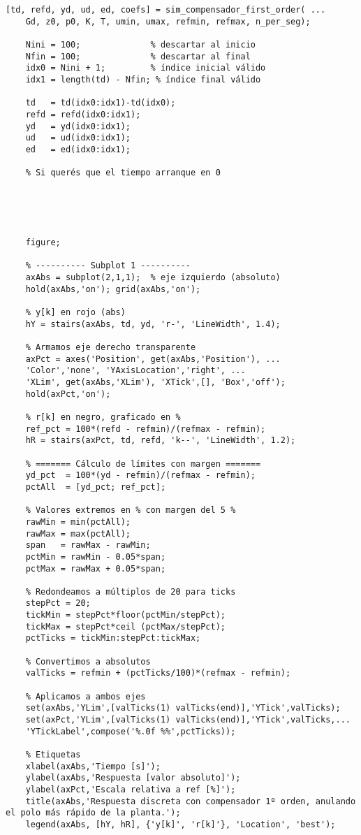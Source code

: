\begin{lstlisting}[style=matlabstyle,caption={Segunda hoja de cálculos utilizada.},label={matlab:calculo2}]
	[td, refd, yd, ud, ed, coefs] = sim_compensador_first_order( ...
	Gd, z0, p0, K, T, umin, umax, refmin, refmax, n_per_seg);
	
	Nini = 100;              % descartar al inicio
	Nfin = 100;              % descartar al final
	idx0 = Nini + 1;         % índice inicial válido
	idx1 = length(td) - Nfin; % índice final válido
	
	td   = td(idx0:idx1)-td(idx0);
	refd = refd(idx0:idx1);
	yd   = yd(idx0:idx1);
	ud   = ud(idx0:idx1);
	ed   = ed(idx0:idx1);
	
	% Si querés que el tiempo arranque en 0
	
	
	
	
	
	figure;
	
	% ---------- Subplot 1 ----------
	axAbs = subplot(2,1,1);  % eje izquierdo (absoluto)
	hold(axAbs,'on'); grid(axAbs,'on');
	
	% y[k] en rojo (abs)
	hY = stairs(axAbs, td, yd, 'r-', 'LineWidth', 1.4);
	
	% Armamos eje derecho transparente
	axPct = axes('Position', get(axAbs,'Position'), ...
	'Color','none', 'YAxisLocation','right', ...
	'XLim', get(axAbs,'XLim'), 'XTick',[], 'Box','off');
	hold(axPct,'on');
	
	% r[k] en negro, graficado en %
	ref_pct = 100*(refd - refmin)/(refmax - refmin);
	hR = stairs(axPct, td, refd, 'k--', 'LineWidth', 1.2);
	
	% ======= Cálculo de límites con margen =======
	yd_pct  = 100*(yd - refmin)/(refmax - refmin);
	pctAll  = [yd_pct; ref_pct];
	
	% Valores extremos en % con margen del 5 %
	rawMin = min(pctAll);
	rawMax = max(pctAll);
	span   = rawMax - rawMin;
	pctMin = rawMin - 0.05*span;
	pctMax = rawMax + 0.05*span;
	
	% Redondeamos a múltiplos de 20 para ticks
	stepPct = 20;
	tickMin = stepPct*floor(pctMin/stepPct);
	tickMax = stepPct*ceil (pctMax/stepPct);
	pctTicks = tickMin:stepPct:tickMax;
	
	% Convertimos a absolutos
	valTicks = refmin + (pctTicks/100)*(refmax - refmin);
	
	% Aplicamos a ambos ejes
	set(axAbs,'YLim',[valTicks(1) valTicks(end)],'YTick',valTicks);
	set(axPct,'YLim',[valTicks(1) valTicks(end)],'YTick',valTicks,...
	'YTickLabel',compose('%.0f %%',pctTicks));
	
	% Etiquetas
	xlabel(axAbs,'Tiempo [s]');
	ylabel(axAbs,'Respuesta [valor absoluto]');
	ylabel(axPct,'Escala relativa a ref [%]');
	title(axAbs,'Respuesta discreta con compensador 1º orden, anulando el polo más rápido de la planta.');
	legend(axAbs, [hY, hR], {'y[k]', 'r[k]'}, 'Location', 'best');
	

\end{lstlisting}
